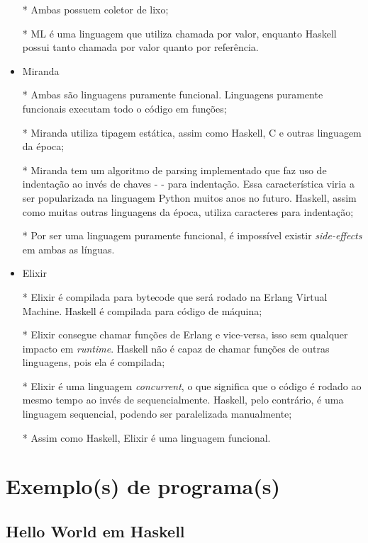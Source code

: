 \documentclass[
  12pt,				         %
  oneside,			       %
  a4paper,			       %
  english,		       	 %
  brazil,			      	 %
]{abntex2}
\begin{document}
\begin{itemize}
      * Ambas possuem coletor de lixo;

      * ML é uma linguagem que utiliza chamada por valor, enquanto Haskell possui tanto chamada por valor quanto por referência.

      \item Miranda 
      
      * Ambas são linguagens puramente funcional. Linguagens puramente funcionais executam todo o código em funções;

      * Miranda utiliza tipagem estática, assim como Haskell, C e outras linguagem da época;

      * Miranda tem um algoritmo de parsing implementado que faz uso de indentação ao invés de chaves - { } - para indentação. 
      Essa característica viria a ser popularizada na linguagem Python muitos anos no futuro. Haskell, assim como muitas outras linguagens da época, 
      utiliza caracteres para indentação;

      * Por ser uma linguagem puramente funcional, é impossível existir \emph{side-effects} em ambas as línguas.
      
      \item Elixir 
    
    * Elixir é compilada para bytecode que será rodado na Erlang Virtual Machine. Haskell é compilada para código de máquina;

    * Elixir consegue chamar funções de Erlang e vice-versa, isso sem qualquer impacto em \emph{runtime}. Haskell não é capaz de chamar funções de outras linguagens, pois ela é compilada;

    * Elixir é uma linguagem \emph{concurrent}, o que significa que o código é rodado ao mesmo tempo ao invés de sequencialmente. Haskell, pelo contrário, é uma linguagem sequencial, podendo ser paralelizada manualmente;

    * Assim como Haskell, Elixir é uma linguagem funcional.

    
    \end{itemize}

    \newpage

    \chapter{Exemplo(s) de programa(s)}

      \setcounter{section}{0}

      \section{Hello World em Haskell}
      
\end{document}
